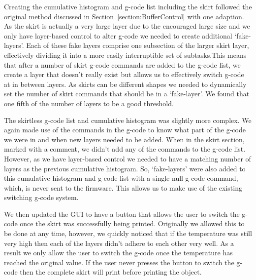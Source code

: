 \documentclass[11pt]{report} %
\begin{document}
Creating the cumulative histogram and g-code list including the skirt followed the original method discussed in Section~\ref{section:BufferControl} with one adaption. As the skirt is actually a very large layer due to the encouraged large size and we only have layer-based control to alter g-code we needed to create additional `fake-layers'. Each of these fake layers comprise one subsection of the larger skirt layer, effectively dividing it into a more easily interruptible set of subtasks.This means that after a number of skirt g-code commands are added to the g-code list, we create a layer that doesn't really exist but allows us to effectively switch g-code at in between layers. As skirts can be different shapes we needed to dynamically set the number of skirt commands that should be in a `fake-layer'. We found that one fifth of the number of layers to be a good threshold. 

The skirtless g-code list and cumulative histogram was slightly more complex. We again made use of the commands in the g-code to know what part of the g-code we were in and when new layers needed to be added. When in the skirt section, marked with a comment, we didn't add any of the commands to the g-code list. However, as we have layer-based control we needed to have a matching number of layers as the previous cumulative histogram. So, `fake-layers' were also added to this cumulative histogram and g-code list with a single null g-code command, which, is never sent to the firmware. This allows us to make use of the existing switching g-code system. 

We then updated the GUI to have a button that allows the user to switch the g-code once the skirt was successfully being printed. Originally we allowed this to be done at any time, however, we quickly noticed that if the temperature was still very high then each of the layers didn't adhere to each other very well. As a result we only allow the user to switch the g-code once the temperature has reached the original value. If the user never presses the button to switch the g-code then the complete skirt will print before printing the object.
\end{document}
